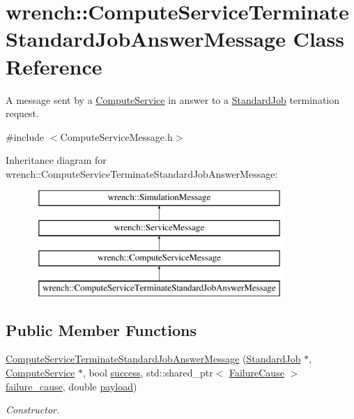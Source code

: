 \hypertarget{classwrench_1_1_compute_service_terminate_standard_job_answer_message}{}\section{wrench\+:\+:Compute\+Service\+Terminate\+Standard\+Job\+Answer\+Message Class Reference}
\label{classwrench_1_1_compute_service_terminate_standard_job_answer_message}


A message sent by a \hyperlink{classwrench_1_1_compute_service}{Compute\+Service} in answer to a \hyperlink{classwrench_1_1_standard_job}{Standard\+Job} termination request.  




{\ttfamily \#include $<$Compute\+Service\+Message.\+h$>$}

Inheritance diagram for wrench\+:\+:Compute\+Service\+Terminate\+Standard\+Job\+Answer\+Message\+:\begin{figure}[H]
\begin{center}
\leavevmode
\includegraphics[height=4.000000cm]{classwrench_1_1_compute_service_terminate_standard_job_answer_message}
\end{center}
\end{figure}
\subsection*{Public Member Functions}
\begin{DoxyCompactItemize}
\item 
\hyperlink{classwrench_1_1_compute_service_terminate_standard_job_answer_message_ab408fa45bc95a5c27cb9c79d914d4ec4}{Compute\+Service\+Terminate\+Standard\+Job\+Answer\+Message} (\hyperlink{classwrench_1_1_standard_job}{Standard\+Job} $\ast$, \hyperlink{classwrench_1_1_compute_service}{Compute\+Service} $\ast$, bool \hyperlink{classwrench_1_1_compute_service_terminate_standard_job_answer_message_a20d4cc317832380680745cc0989e66c1}{success}, std\+::shared\+\_\+ptr$<$ \hyperlink{classwrench_1_1_failure_cause}{Failure\+Cause} $>$ \hyperlink{classwrench_1_1_compute_service_terminate_standard_job_answer_message_a5b3c0dccd49c771c8cc2030ad8f892b6}{failure\+\_\+cause}, double \hyperlink{classwrench_1_1_simulation_message_a914f2732713f7c02898e66f05a7cb8a1}{payload})
\begin{DoxyCompactList}\small\item\em Constructor. \end{DoxyCompactList}\end{DoxyCompactItemize}
